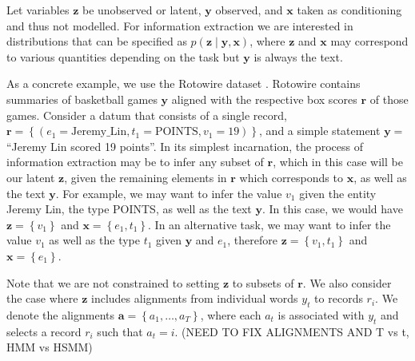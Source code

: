 \documentclass[11pt]{article}
\newcommand\set[1]{\left\{#1\right\}}
\newcommand{\ba}{\mathbf{a}}
\newcommand{\br}{\mathbf{r}}
\newcommand{\bx}{\mathbf{x}}
\newcommand{\by}{\mathbf{y}}
\newcommand{\bz}{\mathbf{z}}
\begin{document}
Let variables $\bz$ be unobserved or latent, $\by$ observed, and $\bx$ taken as conditioning
and thus not modelled.
For information extraction we are interested in distributions that can be specified as $p(\bz\mid\by,\bx)$,
where $\bz$ and $\bx$ may correspond to various quantities depending on the task
but $\by$ is always the text.

As a concrete example, we use the Rotowire dataset \citep{wiseman2017d2t}.
Rotowire contains summaries of basketball games $\by$ aligned with the respective
box scores $\br$ of those games.
Consider a datum that consists of a single record,
$\br = \set{(e_1 = \textrm{Jeremy\_Lin}, t_1 = \textrm{POINTS}, v_1 = 19)}$,
and a simple statement $\by = $``Jeremy Lin scored 19 points''.
In its simplest incarnation, the process of information extraction may be to infer any
subset of $\br$, which in this case will be our latent $\bz$, given the remaining elements in $\br$
which corresponds to $\bx$, as well as the text $\by$.
For example, we may want to infer the value $v_1$ given 
the entity Jeremy Lin, the type POINTS, as well as the text $\by$.
In this case, we would have $\bz = \set{v_1}$ and $\bx = \set{e_1,t_1}$.
In an alternative task, we may want to infer the value $v_1$ 
as well as the type $t_1$ given $\by$ and $e_1$, therefore $\bz = \set{v_1,t_1}$ and $\bx=\set{e_1}$.

Note that we are not constrained to setting $\bz$ to subsets of $\br$.
We also consider the case where $\bz$ includes alignments from individual words $y_t$
to records $r_i$. We denote the alignments $\ba = \set{a_1,\ldots,a_T}$,
where each $a_t$ is associated with $y_t$ and selects a record $r_i$ such that $a_t = i$.
(NEED TO FIX ALIGNMENTS AND T vs t, HMM vs HSMM)
\end{document}
